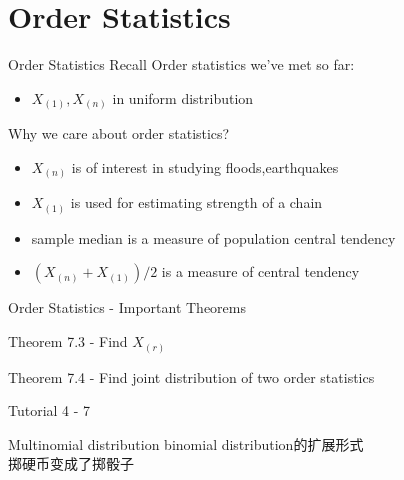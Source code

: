 \documentclass{beamer}
\begin{document}
\section{Order Statistics}
    \begin{frame}{Order Statistics}
        Recall Order statistics we've met so far:\\
        \begin{itemize}
            \item $X_{(1)}, X_{(n)}$ in uniform distribution
        \end{itemize}
        
        Why we care about order statistics?
        \begin{itemize}
            \item $X_{(n)}$ is of interest in studying floods,earthquakes
            \item $X_{(1)}$ is used for estimating strength of a chain
            \item sample median is a measure of population central tendency
            \item $(X_{(n)}+X_{(1)})/2$ is a measure of central tendency
        \end{itemize}
    \end{frame}
    
    \begin{frame}{Order Statistics - Important Theorems}
        \begin{block}{Theorem 7.3 - Find $X_{(r)}$ }
        \end{block}
        \begin{block}{Theorem 7.4 - Find joint distribution of two order statistics}
        \end{block}
        \begin{exampleblock}{Tutorial 4 - 7}
        \end{exampleblock}
    \end{frame}
    
    \begin{frame}{Multinomial distribution}
        binomial distribution的扩展形式\\
        掷硬币变成了掷骰子
    \end{frame}
    
\end{document}
